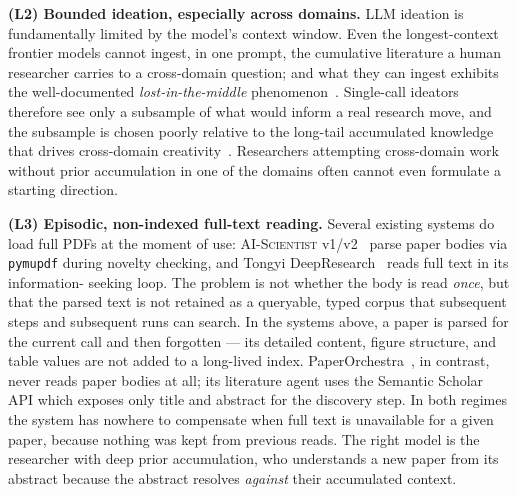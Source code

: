 \documentclass{article}
\newcommand{\code}[1]{\texttt{\small #1}}
\begin{document}
\textbf{(L2) Bounded ideation, especially across domains.} LLM ideation
is fundamentally limited by the model's context window. Even the
longest-context frontier models cannot ingest, in one prompt, the
cumulative literature a human researcher carries to a cross-domain
question; and what they can ingest exhibits the well-documented
\emph{lost-in-the-middle} phenomenon~\cite{lostmiddle}. Single-call
ideators therefore see only a subsample of what would inform a real
research move, and the subsample is chosen poorly relative to the
long-tail accumulated knowledge that drives cross-domain
creativity~\cite{swansonlbd}. Researchers attempting cross-domain work
without prior accumulation in one of the domains often cannot even
formulate a starting direction.

\textbf{(L3) Episodic, non-indexed full-text reading.} Several
existing systems do load full PDFs at the moment of use:
\textsc{AI-Scientist} v1/v2~\cite{aisciv1,aisciv2} parse paper bodies
via \code{pymupdf} during novelty checking, and Tongyi
DeepResearch~\cite{deepresearch} reads full text in its information-
seeking loop. The problem is not whether the body is read \emph{once},
but that the parsed text is not retained as a queryable, typed corpus
that subsequent steps and subsequent runs can search. In the systems
above, a paper is parsed for the current call and then forgotten ---
its detailed content, figure structure, and table values are not added
to a long-lived index. PaperOrchestra~\cite{paperorchestra}, in
contrast, never reads paper bodies at all; its literature agent uses
the Semantic Scholar API which exposes only title and abstract for the
discovery step. In both regimes the system has nowhere to compensate
when full text is unavailable for a given paper, because nothing was
kept from previous reads. The right model is the researcher with deep
prior accumulation, who understands a new paper from its abstract
because the abstract resolves \emph{against} their accumulated
context.
\end{document}
